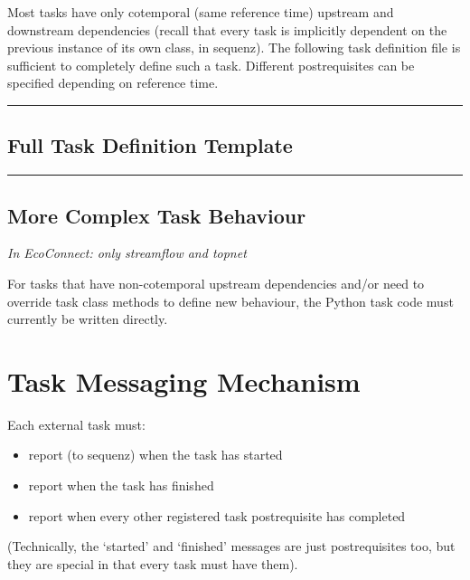\documentclass[11pt,a4paper]{article}
\begin{document}
Most tasks have only cotemporal (same reference time) upstream and
downstream dependencies (recall that every task is implicitly dependent
on the previous instance of its own class, in sequenz). The following
task definition file is sufficient to completely define such a task.
Different postrequisites can be specified depending on reference time. 

\lstset{language=sh, numbers=left}

{\tiny
\noindent
\rule{5cm}{.2mm}

}

\subsection{Full Task Definition Template}

\lstset{language=sh, numbers=left}

{\tiny
\noindent
\rule{5cm}{.2mm}

}

\subsection{More Complex Task Behaviour}

\textit{In EcoConnect: only streamflow and topnet}

For tasks that have non-cotemporal upstream dependencies and/or need to  
override task class methods to define new behaviour, the Python task
code must currently be written directly. 

\section{Task Messaging Mechanism}

Each external task must:

\begin{itemize}
\item report (to sequenz) when the task has started
\item report when the task has finished
\item report when every other registered task postrequisite has
completed
\end{itemize}

(Technically, the `started' and `finished' messages are just
postrequisites too, but they are special in that every task
must have them).
\end{document}
